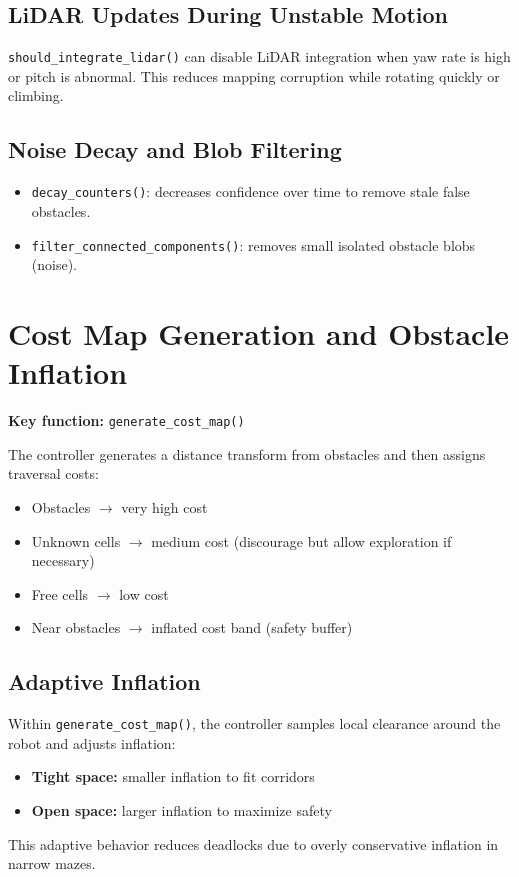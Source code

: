 \documentclass[12pt,a4paper]{article}
\begin{document}
\subsection{LiDAR Updates During Unstable Motion}
\texttt{should\_integrate\_lidar()} can disable LiDAR integration when yaw rate is high or pitch is abnormal. This reduces mapping corruption while rotating quickly or climbing.

\subsection{Noise Decay and Blob Filtering}
\begin{itemize}[leftmargin=2em]
  \item \texttt{decay\_counters()}: decreases confidence over time to remove stale false obstacles.
  \item \texttt{filter\_connected\_components()}: removes small isolated obstacle blobs (noise).
\end{itemize}

\section{Cost Map Generation and Obstacle Inflation}
\textbf{Key function:} \texttt{generate\_cost\_map()}

The controller generates a distance transform from obstacles and then assigns traversal costs:
\begin{itemize}[leftmargin=2em]
  \item Obstacles $\rightarrow$ very high cost
  \item Unknown cells $\rightarrow$ medium cost (discourage but allow exploration if necessary)
  \item Free cells $\rightarrow$ low cost
  \item Near obstacles $\rightarrow$ inflated cost band (safety buffer)
\end{itemize}

\subsection{Adaptive Inflation}
Within \texttt{generate\_cost\_map()}, the controller samples local clearance around the robot and adjusts inflation:
\begin{itemize}[leftmargin=2em]
  \item \textbf{Tight space:} smaller inflation to fit corridors
  \item \textbf{Open space:} larger inflation to maximize safety
\end{itemize}
This adaptive behavior reduces deadlocks due to overly conservative inflation in narrow mazes.
\end{document}
